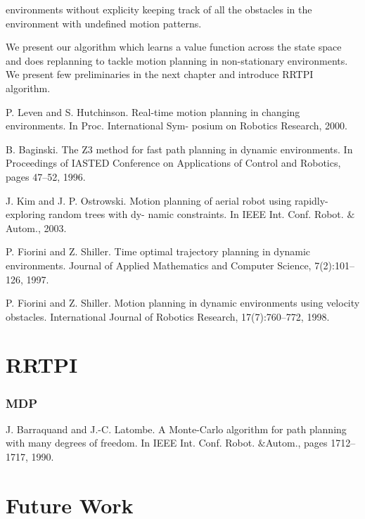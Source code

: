\documentclass[MTech]{iitmdiss}
\begin{document}
environments without explicity keeping track of all the obstacles in the environment with undefined motion patterns.
 
We present our algorithm which learns a value function across the state space and does replanning to tackle motion planning in non-stationary environments. We present few preliminaries in the next chapter and introduce RRTPI algorithm.
 
 
P. Leven and S. Hutchinson. Real-time motion planning in changing environments. In Proc. International Sym- posium on Robotics Research, 2000. 
 
 B. Baginski. The Z3 method for fast path planning in dynamic environments. In Proceedings of IASTED Conference on Applications of Control and Robotics, pages 47–52, 1996.
 
 J. Kim and J. P. Ostrowski. Motion planning of aerial robot using rapidly-exploring random trees with dy- namic constraints. In IEEE Int. Conf. Robot. $\&$ Autom., 2003.
 
P. Fiorini and Z. Shiller. Time optimal trajectory planning in dynamic environments. Journal of Applied Mathematics and Computer Science, 7(2):101–126, 1997.

P. Fiorini and Z. Shiller. Motion planning in dynamic environments using velocity obstacles. International Journal of Robotics Research, 17(7):760–772, 1998. 
 
 
\chapter{RRTPI}

\subsection{MDP}


J. Barraquand and J.-C. Latombe. A Monte-Carlo algorithm for path planning with many degrees of freedom. In IEEE Int. Conf. Robot. $\&$Autom., pages 1712–1717, 1990.



\chapter{Future Work}

%
\pagebreak
\begin{singlespace}
  \begin{small}
	
  \end{small}
\end{singlespace}

\end{document}
